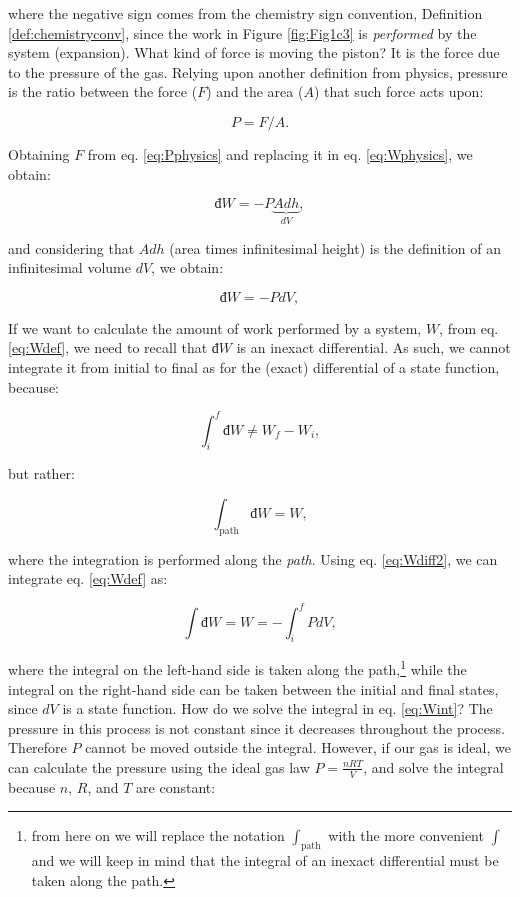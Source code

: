 \documentclass[
]{book}
\theoremstyle{definition}
\theoremstyle{definition}
\theoremstyle{definition}
\theoremstyle{remark}
\begin{document}
where the negative sign comes from the chemistry sign convention, Definition \ref{def:chemistryconv}, since the work in Figure \ref{fig:Fig1c3} is \emph{performed} by the system (expansion). What kind of force is moving the piston? It is the force due to the pressure of the gas. Relying upon another definition from physics, pressure is the ratio between the force (\(F\)) and the area (\(A\)) that such force acts upon:

\begin{equation}
  P = F/A.
  \label{eq:Pphysics}
\end{equation}

Obtaining \(F\) from eq. \eqref{eq:Pphysics} and replacing it in eq. \eqref{eq:Wphysics}, we obtain:

\begin{equation}
  đ W = - P \underbrace{Adh}_{dV},
  \label{eq:Wphysics2}
\end{equation}

and considering that \(Adh\) (area times infinitesimal height) is the definition of an infinitesimal volume \(dV\), we obtain:

\begin{equation}
  đ W = - PdV,
  \label{eq:Wdef}
\end{equation}

If we want to calculate the amount of work performed by a system, \(W\), from eq. \eqref{eq:Wdef}, we need to recall that \(đ W\) is an inexact differential. As such, we cannot integrate it from initial to final as for the (exact) differential of a state function, because:

\begin{equation}
  \int_{i}^{f}đ W \neq W_f - W_i,
  \label{eq:Wdiff}
\end{equation}

but rather:

\begin{equation}
  \int_{\text{path}} đ W = W,
  \label{eq:Wdiff2}
\end{equation}

where the integration is performed along the \emph{path}. Using eq. \eqref{eq:Wdiff2}, we can integrate eq. \eqref{eq:Wdef} as:

\begin{equation}
  \int đ W = W = - \int_{i}^{f} PdV,
  \label{eq:Wint}
\end{equation}

where the integral on the left-hand side is taken along the path,\footnote{from here on we will replace the notation \(\int_{\text{path}}\) with the more convenient \(\int\) and we will keep in mind that the integral of an inexact differential must be taken along the path.} while the integral on the right-hand side can be taken between the initial and final states, since \(dV\) is a state function.
How do we solve the integral in eq. \eqref{eq:Wint}? The pressure in this process is not constant since it decreases throughout the process. Therefore \(P\) cannot be moved outside the integral. However, if our gas is ideal, we can calculate the pressure using the ideal gas law \(P=\frac{nRT}{V}\), and solve the integral because \(n\), \(R\), and \(T\) are constant:
\end{document}
